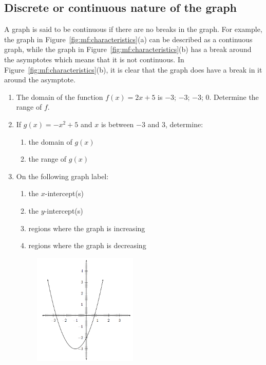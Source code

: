 \subsection*{Discrete or continuous nature of the graph}
\nopagebreak
A graph is said to be continuous if there are no breaks in the graph. For example, the graph in Figure~\ref{fig:mf:characteristics}(a) can be described as a continuous graph, while the graph in Figure~\ref{fig:mf:characteristics}(b) has a break around the asymptotes which means that it is not continuous.
In Figure~\ref{fig:mf:characteristics}(b), it is clear that the graph does have a break in it around the asymptote.\par 


\begin{exercises}{}
{\nopagebreak
\begin{enumerate}[noitemsep, label=\textbf{\arabic*}. ] 
\item The domain of the function $f(x)=2x+5$ is $-3$; $-3$; $-3$; $0$. Determine the range of $f$.
\item If $g(x)=-{x}^{2}+5$ and $x$ is between $-3$ and $3$, determine:
    \begin{enumerate}[noitemsep, label=\textbf{\alph*}. ] 
    \item the domain of $g(x)$
    \item the range of $g(x)$
    \end{enumerate}
\item On the following graph label:
    \begin{enumerate}[noitemsep, label=\textbf{\alph*}. ] 
    \item the $x$-intercept(s)
    \item the $y$-intercept(s)
    \item regions where the graph is increasing
    \item regions where the graph is decreasing
    \end{enumerate}

\setcounter{subfigure}{0}
\begin{figure}[H] %
\begin{center}
\label{m39337*id237308!!!underscore!!!media}\label{m39337*id237308!!!underscore!!!printimage}\includegraphics[height=200px]{col11306.imgs/m39337_MG10C11_003.png} %
\vspace{2pt}
\vspace{.1in}
\end{center}
\end{figure}               


\end{enumerate}}
\end{exercises}
